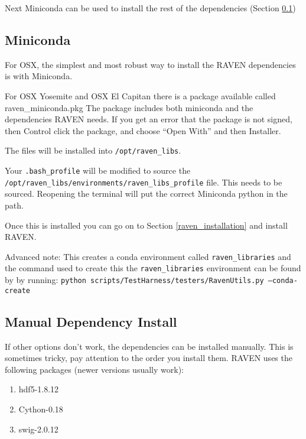 Next Miniconda can be used to install the rest of the dependencies
(Section \ref{miniconda})


\subsection{Miniconda}
\label{miniconda}

For OSX, the simplest and most robust way to install the RAVEN dependencies
is with Miniconda.

For OSX Yosemite and OSX El Capitan there is a package available
called raven\_miniconda.pkg The package includes both miniconda and
the dependencies RAVEN needs. If you get an error that the package is
not signed, then Control click the package, and choose ``Open With''
and then Installer.

The files will be installed into \texttt{/opt/raven\_libs}.

Your \texttt{.bash\_profile} will be modified to source
the\\ \texttt{/opt/raven\_libs/environments/raven\_libs\_profile}
file.  This needs to be sourced.  Reopening the terminal will put the
correct Miniconda python in the path.

Once this is installed you can go on to Section \ref{raven_installation} and install RAVEN.

Advanced note: This creates a conda environment called
\texttt{raven\_libraries} and the command used to create this the \texttt{raven\_libraries} environment can be found by by running:
\texttt{python scripts/TestHarness/testers/RavenUtils.py --conda-create}

\subsection{Manual Dependency Install}

If other options don't work, the dependencies can be installed
manually.  This is sometimes tricky, pay attention to the order you
install them.  RAVEN uses the following packages (newer versions
usually work):

\begin{enumerate}
  
\item hdf5-1.8.12
\item Cython-0.18
\item swig-2.0.12
\end{enumerate}

